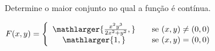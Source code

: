 
Determine o maior conjunto no qual a função é contínua.


$ F(x,y)=\left\{ 
				\begin{array}{cc}
					\mathlarger{\frac{x^2y^3}{2x^2+y^2},} & \quad \textnormal{se } (x,y)\neq(0,0)\\
					\mathlarger{1,} & \quad \textnormal{se } (x,y) = (0,0)\\
				\end{array}
				\right.$
